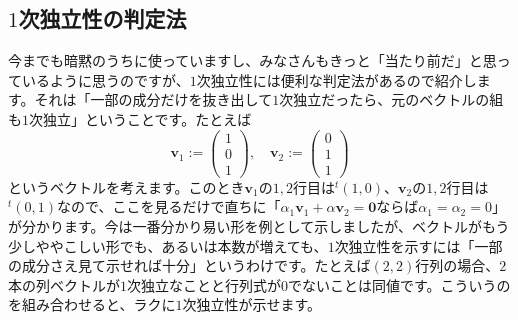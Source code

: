 \subsection{$1$次独立性の判定法}

今までも暗黙のうちに使っていますし、みなさんもきっと「当たり前だ」と思っているように思うのですが、$1$次独立性には便利な判定法があるので紹介します。それは「一部の成分だけを抜き出して$1$次独立だったら、元のベクトルの組も$1$次独立」ということです。たとえば
\[
\bm{v}_1 :=
\begin{pmatrix}
1 \\
0 \\
1
\end{pmatrix}, \quad
\bm{v}_2 :=
\begin{pmatrix}
0 \\
1 \\
1
\end{pmatrix}
\]
というベクトルを考えます。このとき$\bm{v}_1$の$1, 2$行目は${}^t(1, 0)$、$\bm{v}_2$の$1, 2$行目は${}^t (0, 1)$なので、ここを見るだけで直ちに「$\alpha_1 \bm{v}_1 + \alpha \bm{v}_2 = \bm{0}$ならば$\alpha_1 = \alpha_2 = 0$」が分かります。今は一番分かり易い形を例として示しましたが、ベクトルがもう少しややこしい形でも、あるいは本数が増えても、$1$次独立性を示すには「一部の成分さえ見て示せれば十分」というわけです。たとえば$(2, 2)$行列の場合、$2$本の列ベクトルが$1$次独立なことと行列式が$0$でないことは同値です。こういうのを組み合わせると、ラクに$1$次独立性が示せます。

